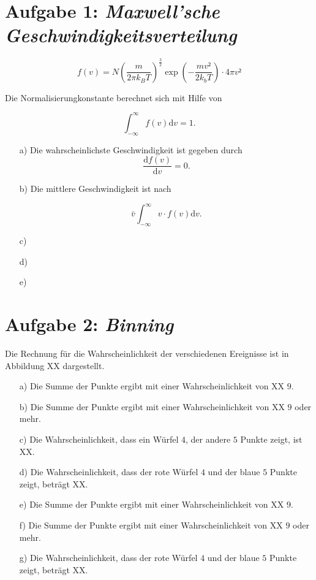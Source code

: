  
\section*{Aufgabe 1: \emph{Maxwell'sche Geschwindigkeitsverteilung}}

\begin{equation}
f(v)=N\left(\frac{m}{2\pi k_BT}\right)^\frac{3}{2}\exp{\left(-\frac{mv²}{2k_bT}\right)}\cdot4\pi v²
\end{equation}

Die Normalisierungkonstante berechnet sich mit Hilfe von

\begin{equation}
\int_{-\infty}^\infty f(v)\text{d}v=1.
\end{equation}

\begin{itemize}
\item[a)] Die wahrscheinlichste Geschwindigkeit ist gegeben durch
\begin{equation}
\frac{\text{d}f(v)}{\text{d}v}=0.
\end{equation}

\item[b)] Die mittlere Geschwindigkeit ist nach

\begin{equation}
\bar{v}\int_{-\infty}^\infty v\cdot f(v)\text{d}v.
\end{equation}



\item[c)]
\item[d)]
\item[e)]
\end{itemize}
\section*{Aufgabe 2: \emph{Binning}}

Die Rechnung für die Wahrscheinlichkeit der verschiedenen Ereignisse ist in Abbildung XX dargestellt.

\begin{itemize}
\item[a)] Die Summe der Punkte ergibt mit einer Wahrscheinlichkeit von XX $9$.

\item[b)] Die Summe der Punkte ergibt mit einer Wahrscheinlichkeit von XX $9$ oder mehr.

\item[c)] Die Wahrscheinlichkeit, dass ein Würfel $4$, der andere $5$ Punkte zeigt, ist XX.

\item[d)] Die Wahrscheinlichkeit, dass der rote Würfel $4$ und 
der blaue $5$ Punkte zeigt, beträgt XX.

\item[e)] Die Summe der Punkte ergibt mit einer Wahrscheinlichkeit von XX $9$.

\item[f)] Die Summe der Punkte ergibt mit einer 
Wahrscheinlichkeit von XX $9$ oder mehr.

\item[g)]Die Wahrscheinlichkeit, dass der rote Würfel $4$ und der blaue $5$ Punkte zeigt, beträgt XX.
\end{itemize}
